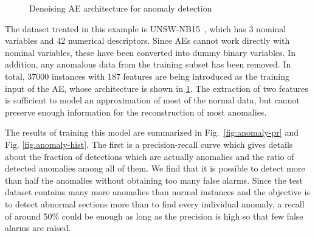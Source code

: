 \documentclass[
	fontsize=11pt, %
	twoside=false, %
	open=any, %
	secnumdepth=1, %
]{kaobook}
\begin{document}
\begin{figure}[ht]
    \centering\small
    \caption{Denoising AE architecture for anomaly detection}
    \label{fig:anomaly}
\end{figure}


The dataset treated in this example is UNSW-NB15~\cite{unsw}, which has 3 nominal variables and 42 numerical descriptors. Since AEs cannot work directly with nominal variables, these have been converted into dummy binary variables. In addition, any anomalous data from the training subset has been removed. In total, 37000 instances with 187 features  are being introduced as the training input of the AE, whose architecture is shown in \ref{fig:anomaly}. The extraction of two features is sufficient to model an approximation of most of the normal data, but cannot preserve enough information for the reconstruction of most anomalies. 

The results of training this model are summarized in Fig.~\ref{fig:anomaly-pr} and Fig. \ref{fig.anomaly-hist}. The first is a precision-recall curve which gives details about the fraction of detections which are actually anomalies and the ratio of detected anomalies among all of them. We find that it is possible to detect more than half the anomalies without obtaining too many false alarms. Since the test dataset contains many more anomalies than normal instances and the objective is to detect abnormal sections more than to find every individual anomaly, a recall of around 50\% could be enough as long as the precision is high so that few false alarms are raised.
\end{document}
